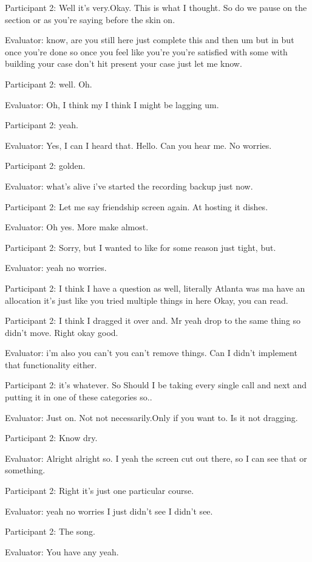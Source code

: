 \documentclass{l4proj}
\begin{document}
\begin{appendices}
Participant 2: Well it's very.Okay. This is what I thought. So do we pause on the section or as you're saying before the skin on.

Evaluator: know, are you still here just complete this and then um but in but once you're done so once you feel like you're you're satisfied with some with building your case don't hit present your case just let me know.

Participant 2: well. Oh.

Evaluator: Oh, I think my I think I might be lagging um.

Participant 2: yeah.

Evaluator: Yes, I can I heard that. Hello. Can you hear me. No worries.

Participant 2: golden.

Evaluator: what's alive i've started the recording backup just now.

Participant 2: Let me say friendship screen again. At hosting it dishes.

Evaluator: Oh yes. More make almost.

Participant 2: Sorry, but I wanted to like for some reason just tight, but.

Evaluator: yeah no worries.

Participant 2: I think I have a question as well, literally Atlanta was ma have an allocation it's just like you tried multiple things in here Okay, you can read.

Participant 2: I think I dragged it over and. Mr yeah drop to the same thing so didn't move. Right okay good.

Evaluator: i'm also you can't you can't remove things. Can I didn't implement that functionality either.

Participant 2: it's whatever. So Should I be taking every single call and next and putting it in one of these categories so..

Evaluator: Just on. Not not necessarily.Only if you want to. Is it not dragging.

Participant 2: Know dry.

Evaluator: Alright alright so. I yeah the screen cut out there, so I can see that or something.

Participant 2: Right it's just one particular course.

Evaluator: yeah no worries I just didn't see I didn't see.

Participant 2: The song.

Evaluator: You have any yeah.


\end{appendices}
\end{document}
